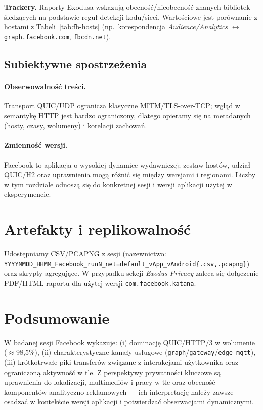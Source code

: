 \textbf{Trackery.} Raporty Exodusa wskazują obecność/nieobecność znanych bibliotek śledzących na podstawie reguł detekcji kodu/sieci. Wartościowe jest porównanie z hostami z Tabeli~\ref{tab:fb-hosts} (np.\ korespondencja \textit{Audience/Analytics} \(\leftrightarrow\) \texttt{graph.facebook.com}, \texttt{fbcdn.net}). 

\subsection{Subiektywne spostrzeżenia}
\paragraph{Obserwowalność treści.}
Transport QUIC/UDP ogranicza klasyczne MITM/TLS-over-TCP; wgląd w semantykę HTTP jest bardzo ograniczony, dlatego opieramy się na metadanych (hosty, czasy, wolumeny) i korelacji zachowań.

\paragraph{Zmienność wersji.}
Facebook to aplikacja o wysokiej dynamice wydawniczej; zestaw hostów, udział QUIC/H2 oraz uprawnienia mogą różnić się między wersjami i regionami. Liczby w tym rozdziale odnoszą się do konkretnej sesji i wersji aplikacji użytej w eksperymencie.

\section{Artefakty i replikowalność}
Udostępniamy CSV/PCAPNG z sesji (nazewnictwo: \texttt{YYYYMMDD\_HHMM\_Facebook\_runN\_net=default\_vApp\_vAndroid\{.csv,.pcapng\}}) oraz skrypty agregujące. W przypadku sekcji \emph{Exodus Privacy} zaleca się dołączenie PDF/HTML raportu dla użytej wersji \texttt{com.facebook.katana}.

\section{Podsumowanie}
W badanej sesji Facebook wykazuje: (i) dominację QUIC/HTTP/3 w wolumenie ($\approx$98{,}5\%), (ii) charakterystyczne kanały usługowe (\texttt{graph}/\texttt{gateway}/\texttt{edge-mqtt}), (iii) krótkotrwałe piki transferów związane z interakcjami użytkownika oraz ograniczoną aktywność w tle. Z perspektywy prywatności kluczowe są uprawnienia do lokalizacji, multimediów i pracy w tle oraz obecność komponentów analityczno-reklamowych — ich interpretację należy zawsze osadzać w kontekście wersji aplikacji i potwierdzać obserwacjami dynamicznymi.
